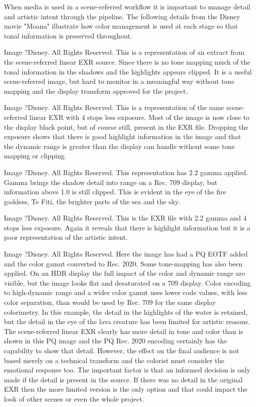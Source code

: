 When media is used in a scene-referred workflow it is important to manage detail and artistic intent through the pipeline. The following details from the Disney movie "Moana" illustrate how color management is used at each stage so that tonal information is preserved throughout.

Image ?Disney. All Rights Reserved.
This is a representation of an extract from the scene-referred linear EXR source. Since there is no tone mapping much of the tonal information in the shadows and the highlights appears clipped. It is a useful scene-referred image, but hard to monitor in a meaningful way without tone mapping and the display transform approved for the project.


Image ?Disney. All Rights Reserved.
This is a representation of the same scene-referred linear EXR with 4 stops less exposure. Most of the image is now close to the display black point, but of course still, present in the EXR file. Dropping the exposure shows that there is good highlight information in the image and that the dynamic range is greater than the display can handle without some tone mapping or clipping.


Image ?Disney. All Rights Reserved.
This representation has 2.2 gamma applied. Gamma brings the shadow detail into range on a Rec. 709 display, but information above 1.0 is still clipped. This is evident in the eye of the fire goddess, Te Fiti, the brighter parts of the sea and the sky.

Image ?Disney. All Rights Reserved.
This is the EXR file with 2.2 gamma and 4 stops less exposure. Again it reveals that there is highlight information but it is a poor representation of the artistic intent.

Image ?Disney. All Rights Reserved.
Here the image has had a PQ EOTF added and the color gamut converted to Rec. 2020. Some tone-mapping has also been applied. On an HDR display the full impact of the color and dynamic range are visible, but the image looks flat and desaturated on a 709 display. Color encoding to high-dynamic range and a wider color gamut uses lower code values, with less color separation, than would be used by Rec. 709 for the same display colorimetry. In this example, the detail in the highlights of the water is retained, but the detail in the eye of the lava creature has been limited for artistic reasons. The scene-referred linear EXR clearly has more detail in tone and color than is shown in this PQ image and the PQ  Rec. 2020 encoding certainly has the capability to show that detail. However, the effect on the final audience is not based merely on a technical transform and the colorist must consider the emotional response too. The important factor is that an informed decision is only made if the detail is present in the source. If there was no detail in the original EXR then the more limited version is the only option and that could impact the look of other scenes or even the whole project.


